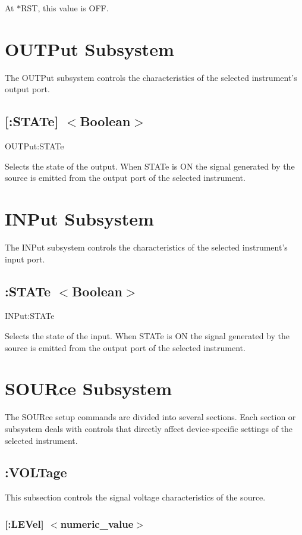 At $\ast$\-R\-S\-T, this value is O\-F\-F.\hypertarget{a00002_outp}{}\section{O\-U\-T\-Put Subsystem}\label{a00002_outp}
The O\-U\-T\-Put subsystem controls the characteristics of the selected instrument's output port.\hypertarget{a00002_outpstat}{}\subsection{\mbox{[}\-:\-S\-T\-A\-Te\mbox{]} $<$\-Boolean$>$}\label{a00002_outpstat}
{\ttfamily O\-U\-T\-Put\-:S\-T\-A\-Te}\par
 Selects the state of the output. When S\-T\-A\-Te is O\-N the signal generated by the source is emitted from the output port of the selected instrument.\hypertarget{a00002_inp}{}\section{I\-N\-Put Subsystem}\label{a00002_inp}
The I\-N\-Put subsystem controls the characteristics of the selected instrument's input port.\hypertarget{a00002_inpstat}{}\subsection{\-:\-S\-T\-A\-Te $<$\-Boolean$>$}\label{a00002_inpstat}
{\ttfamily I\-N\-Put\-:S\-T\-A\-Te}\par
 Selects the state of the input. When S\-T\-A\-Te is O\-N the signal generated by the source is emitted from the output port of the selected instrument.\hypertarget{a00002_sour}{}\section{S\-O\-U\-Rce Subsystem}\label{a00002_sour}
The S\-O\-U\-Rce setup commands are divided into several sections. Each section or subsystem deals with controls that directly affect device-\/specific settings of the selected instrument.\hypertarget{a00002_sourvolt}{}\subsection{\-:\-V\-O\-L\-Tage}\label{a00002_sourvolt}
This subsection controls the signal voltage characteristics of the source.\hypertarget{a00002_sourvoltlev}{}\subsubsection{\mbox{[}\-:\-L\-E\-Vel\mbox{]} $<$numeric\-\_\-value$>$}\label{a00002_sourvoltlev}
